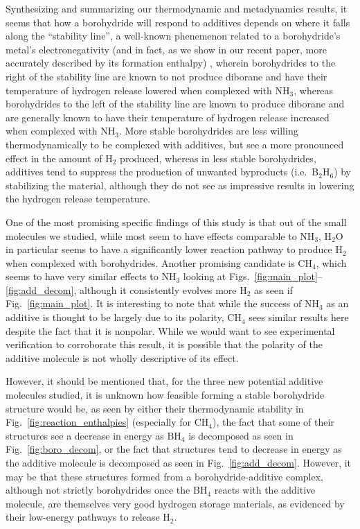 \documentclass[twocolumn, prb, showpacs]{revtex4-1}
\begin{document}
Synthesizing and summarizing our thermodynamic and metadynamics results,
it seems that how a borohydride will respond to additives depends on where
it falls along the ``stability line'', a well-known phenemenon related
to a borohydride's metal's electronegativity (and in fact, as we show in our
recent paper, more accurately described by its formation enthalpy) \cite{Harrison_2016:suppressing_diborane}, wherein
borohydrides to the right of the stability line are known to not produce
diborane and have their temperature of hydrogen release lowered when complexed
with NH$_3$, whereas borohydrides to the left of the stability line are
known to produce diborane and are generally known to have their temperature
of hydrogen release increased when complexed with NH$_3$. More stable borohydrides
are less willing thermodynamically to be complexed with additives, but see
a more pronounced effect in the amount of H$_2$ produced, whereas in less
stable borohydrides, additives tend to suppress the production of unwanted
byproducts (i.e.\ B$_2$H$_6$) by stabilizing the material, although they
do not see as impressive results in lowering the hydrogen release temperature.


One of the most promising specific findings of this study is that out of the
small molecules we studied, while most seem to have effects comparable to 
NH$_3$, H$_2$O in particular seems to have a significantly lower reaction
pathway to produce H$_2$ when complexed with borohydrides. 
Another promising candidate is CH$_4$, which seems to have very similar
effects to NH$_3$ looking at Figs.~\ref{fig:main_plot}--\ref{fig:add_decom},
although it consistently evolves more H$_2$ as seen if Fig.~\ref{fig:main_plot}.
It is interesting to note that while the success of NH$_3$ as an additive is thought
to be largely due to its polarity\cite{Guo_2012:ammine_aluminium,Welchman_2017:decomposition_mechanisms}, CH$_4$
sees similar results here despite the fact that it is nonpolar. While we
would want to see experimental verification to corroborate this result,
it is possible that the polarity of the additive molecule is not wholly
descriptive of its effect.

However, it should
be mentioned that, for the three new potential additive molecules studied, it is unknown
how feasible forming a stable borohydride structure would be, as
seen by either their thermodynamic stability in Fig.~\ref{fig:reaction_enthalpies} (especially for CH$_4$), the
fact that some of their structures see a decrease in energy as BH$_4$ is decomposed
as seen in Fig.~\ref{fig:boro_decom}, or the fact that structures tend to
decrease in energy as the additive molecule is decomposed as seen in Fig.~\ref{fig:add_decom}.
However, it may be that these structures formed from a borohydride-additive complex, although not strictly borohydrides
once the BH$_4$ reacts with the additive molecule, are themselves very good hydrogen storage materials,
as evidenced by their low-energy pathways to release H$_2$.
\end{document}
